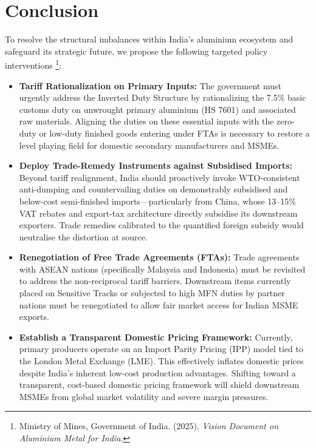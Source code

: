 \documentclass[11pt, a4paper]{article}
\numberwithin{figure}{section}
\numberwithin{table}{section}
\begin{document}
\section{Conclusion}
To resolve the structural imbalances within India's aluminium ecosystem and safeguard its strategic future, we propose the following targeted policy interventions \cite{mom_vision2025}\footnote{Ministry of Mines, Government of India. (2025). \textit{Vision Document on Aluminium Metal for India}.}:

\begin{itemize}
    \item \textbf{Tariff Rationalization on Primary Inputs:}
    The government must urgently address the Inverted Duty Structure by rationalizing the 7.5\% basic customs duty on unwrought primary aluminium (HS 7601) and associated raw materials. Aligning the duties on these essential inputs with the zero-duty or low-duty finished goods entering under FTAs is necessary to restore a level playing field for domestic secondary manufacturers and MSMEs.

    \item \textbf{Deploy Trade-Remedy Instruments against Subsidised Imports:}
    Beyond tariff realignment, India should proactively invoke WTO-consistent anti-dumping and countervailing duties on demonstrably subsidised and below-cost semi-finished imports—particularly from China, whose 13--15\% VAT rebates and export-tax architecture directly subsidise its downstream exporters. Trade remedies calibrated to the quantified foreign subsidy would neutralise the distortion at source.

    \item \textbf{Renegotiation of Free Trade Agreements (FTAs):}
    Trade agreements with ASEAN nations (specifically Malaysia and Indonesia) must be revisited to address the non-reciprocal tariff barriers. Downstream items currently placed on Sensitive Tracks or subjected to high MFN duties by partner nations must be renegotiated to allow fair market access for Indian MSME exports.

    \item \textbf{Establish a Transparent Domestic Pricing Framework:}
    Currently, primary producers operate on an Import Parity Pricing (IPP) model tied to the London Metal Exchange (LME). This effectively inflates domestic prices despite India's inherent low-cost production advantages. Shifting toward a transparent, cost-based domestic pricing framework will shield downstream MSMEs from global market volatility and severe margin pressures.


\end{itemize}
\end{document}
